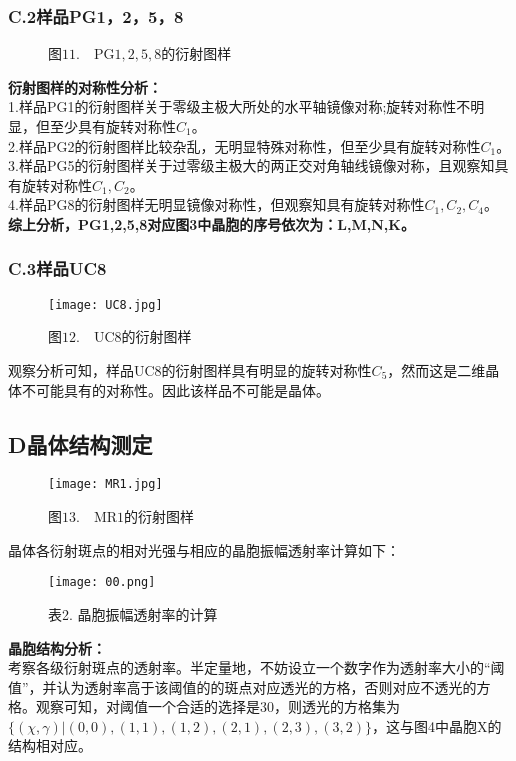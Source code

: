 \documentclass{ctexart}
\begin{document}
\subsubsection*{C.2\quad 样品PG1，2，5，8}
\begin{figure}[htbp]
  \centering
  \quad    
  \quad
  \quad
  \caption*{图$11.\quad \mathrm{PG1,2,5,8}$的衍射图样}
\end{figure}
\noindent \textbf{衍射图样的对称性分析：}\\
\noindent 1.样品PG1的衍射图样关于零级主极大所处的水平轴镜像对称;旋转对称性不明显，但至少具有旋转对称性$C_1$。\\
\noindent 2.样品PG2的衍射图样比较杂乱，无明显特殊对称性，但至少具有旋转对称性$C_1$。\\
\noindent 3.样品PG5的衍射图样关于过零级主极大的两正交对角轴线镜像对称，且观察知具有旋转对称性$C_1,C_2$。\\
\noindent 4.样品PG8的衍射图样无明显镜像对称性，但观察知具有旋转对称性$C_1,C_2,C_4$。\\
\textbf{综上分析，PG1,2,5,8对应图3中晶胞的序号依次为：L,M,N,K。}
\subsubsection*{C.3\quad 样品UC8}
\begin{figure}[H]
  \centering
  \texttt{[image: UC8.jpg]}
  \caption*{图$12.\quad \mathrm{UC8}$的衍射图样}
\end{figure}
观察分析可知，样品UC8的衍射图样具有明显的旋转对称性$C_5$，然而这是二维晶体不可能具有的对称性。因此该样品不可能是晶体。
\clearpage
\subsection*{D\quad 晶体结构测定}
\begin{figure}[H]
  \centering 
  \texttt{[image: MR1.jpg]}
  \caption*{图$13.\quad \mathrm{MR1}$的衍射图样}
\end{figure}
晶体各衍射斑点的相对光强与相应的晶胞振幅透射率计算如下：
\noindent \\

\begin{figure}[htbp]
  \centering
  \texttt{[image: 00.png]}
  \caption*{表2. 晶胞振幅透射率的计算}
\end{figure}
\noindent \textbf{晶胞结构分析：}\\
考察各级衍射斑点的透射率。半定量地，不妨设立一个数字作为透射率大小的“阈值”，并认为透射率高于该阈值的的斑点对应透光的方格，否则对应不透光的方格。观察可知，对阈值一个合适的选择是30，则透光的方格集为$\{(\chi ,\gamma )|(0,0),(1,1),(1,2),(2,1),(2,3),(3,2)\}$，这与图4中晶胞X的结构相对应。\\
\clearpage
\end{document}
